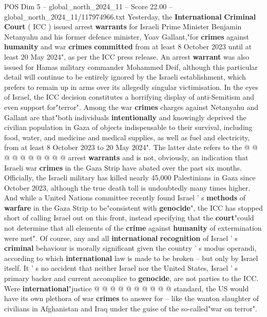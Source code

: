 \begin{textsample}{POS Dim 5 – global\_north\_2024\_11 – Score 22.00 – global\_north\_2024\_11/117974966.txt}  \label{ex:f5_pos_035}
Yesterday, the \textbf{International} \textbf{Criminal} \textbf{Court} ( ICC ) issued arrest \textbf{warrants} for Israeli Prime Minister Benjamin Netanyahu and his former defence minister, Yoav Gallant,"for \textbf{crimes} against \textbf{humanity} and war \textbf{crimes} \textbf{committed} from at least 8 October 2023 until at least 20 May 2024", as per the ICC press release.
An arrest \textbf{warrant} was also issued for Hamas military commander Mohammed Deif, although this particular detail will continue to be entirely ignored by the Israeli establishment, which prefers to remain up in arms over its allegedly singular victimisation.
In the eyes of Israel, the ICC decision constitutes a horrifying display of anti-Semitism and even support for"terror".
Among the war \textbf{crimes} charges against Netanyahu and Gallant are that"both individuals \textbf{intentionally} and knowingly deprived the civilian population in Gaza of objects indispensable to their survival, including food, water, and medicine and medical supplies, as well as fuel and electricity, from at least 8 October 2023 to 20 May 2024".
The latter date refers to the @ @ @ @ @ @ @ @ @ @ arrest \textbf{warrants} and is not, obviously, an indication that Israeli war \textbf{crimes} in the Gaza Strip have abated over the past six months.
Officially, the Israeli military has killed nearly 45,000 Palestinians in Gaza since October 2023, although the true death toll is undoubtedly many times higher.
And while a United Nations committee recently found Israel ' s \textbf{methods} of \textbf{warfare} in the Gaza Strip to be"consistent with \textbf{genocide}", the ICC has stopped short of calling Israel out on this front, instead specifying that the \textbf{court}"could not determine that all elements of the \textbf{crime} against \textbf{humanity} of extermination were met".
Of course, any and all \textbf{international} \textbf{recognition} of Israel ' s \textbf{criminal} behaviour is morally significant given the country ' s modus operandi, according to which \textbf{international} law is made to be broken -- but only by Israel itself.
It ' s no accident that neither Israel nor the United States, Israel ' s primary backer and current accomplice to \textbf{genocide}, are not parties to the ICC.
Were \textbf{international}"justice @ @ @ @ @ @ @ @ @ @ standard, the US would have its own plethora of war \textbf{crimes} to answer for -- like the wanton slaughter of civilians in Afghanistan and Iraq under the guise of the so-called"war on terror".

\end{textsample}
